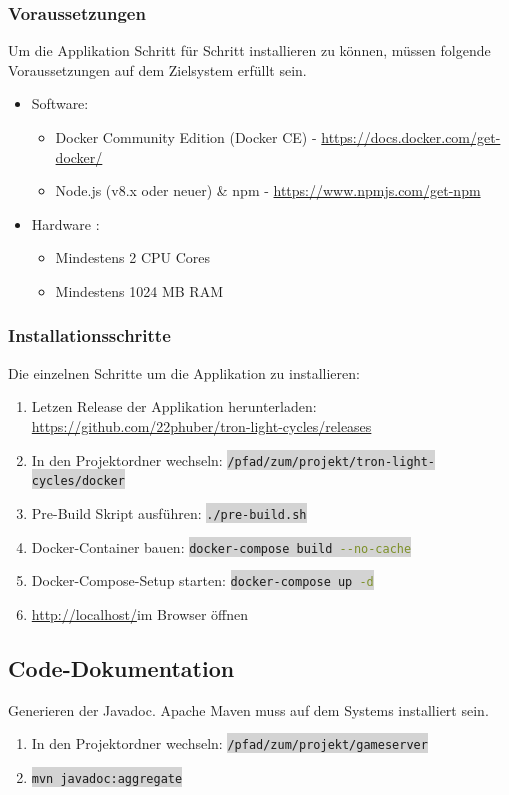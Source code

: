 \documentclass[11pt,ngerman]{article}
\newcommand{\inlinecode}[2]{\colorbox{lightgray}{\lstinline[language=#1]$#2$}}
\begin{document}
    \subsubsection{Voraussetzungen}
    Um die Applikation Schritt für Schritt installieren zu können, müssen folgende Voraussetzungen auf dem Zielsystem erfüllt sein.
    \begin{itemize}
        \item Software:
            \begin{itemize}
                \item Docker Community Edition (Docker CE) - \url{https://docs.docker.com/get-docker/}
                \item Node.js (v8.x oder neuer) \& npm  - \url{https://www.npmjs.com/get-npm}
            \end{itemize}
        \item Hardware :
            \begin{itemize}
                \item Mindestens 2 CPU Cores
                \item Mindestens 1024 MB RAM
            \end{itemize}
    \end{itemize}

    \subsubsection{Installationsschritte}
    Die einzelnen Schritte um die Applikation zu installieren:
    \begin{enumerate}
        \item Letzen Release der Applikation herunterladen: \url{https://github.com/22phuber/tron-light-cycles/releases}
        \item In den Projektordner wechseln: \inlinecode{bash}{/pfad/zum/projekt/tron-light-cycles/docker}
        \item Pre-Build Skript ausführen: \inlinecode{bash}{./pre-build.sh}
        \item \Gls{Docker}-Container bauen: \inlinecode{bash}{docker-compose build --no-cache}
        \item \Gls{Docker-Compose}-Setup starten: \inlinecode{bash}{docker-compose up -d}
        \item \url{http://localhost/}im Browser öffnen
    \end{enumerate}


    \subsection{Code-Dokumentation}
    Generieren der Javadoc. \Gls{Apache Maven} muss auf dem Systems installiert sein.
    \begin{enumerate}
        \item In den Projektordner wechseln: \inlinecode{bash}{/pfad/zum/projekt/gameserver}
        \item \inlinecode{bash}{mvn javadoc:aggregate}
    \end{enumerate}
\end{document}

